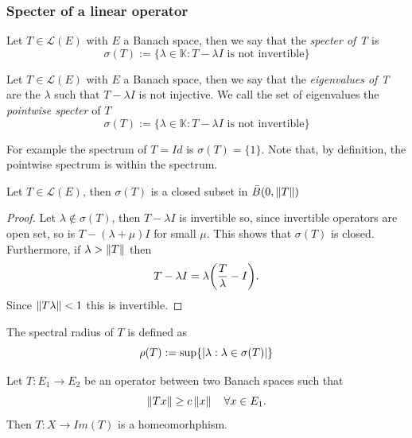 \documentclass[
    a4paper,
    DIV=14,
    abstract=true,
    numbers=noenddot
]{scrartcl}
\begin{document}
\subsubsection{Specter of a linear operator}
\begin{definition}
	Let $T\in\mathcal{L}(E)$ with $E$ a Banach space, then we say that the \emph{specter of T} is
	\begin{equation*}
		\sigma(T):=\{\lambda\in\mathbb{K}: T-\lambda I \text{ is not invertible}\}
	\end{equation*}
\end{definition}
\begin{definition}
	Let $T\in\mathcal{L}(E)$ with $E$ a Banach space, then we say that the \emph{eigenvalues of T} are the $\lambda$ such that $T-\lambda I$ is not injective. We call the set of eigenvalues the \emph{pointwise specter} of $T$
	\begin{equation*}
		\sigma(T):=\{\lambda\in\mathbb{K}: T-\lambda I \text{ is not invertible}\}
	\end{equation*}
\end{definition}
For example the spectrum of $T=Id$ is $\sigma(T)=\{1\}$. Note that, by definition, the pointwise spectrum is within the spectrum.
\begin{proposition}
	Let $T\in\mathcal{L}(E)$, then $\sigma(T)$ is a closed subset in $\bar{B}(0,\left\lVert T \right\rVert)$
\end{proposition}
\begin{proof}
	Let $\lambda\notin \sigma(T)$, then $T-\lambda I$ is invertible so, since invertible operators are open set, so is  $T-(\lambda+\mu) I$ for small $\mu$. This shows that $\sigma(T)$ is closed. Furthermore, if $\lambda>\left\lVert T \right\rVert$ then
	\begin{equation*}
		T-\lambda I=\lambda \qty(\frac{T}{\lambda}-I).
	\end{equation*}
	Since $\left\lVert T\lambda \right\rVert<1$ this is invertible.
\end{proof}
\begin{definition}
	The spectral radius of $T$ is defined as
	\begin{equation*}
		\rho(T):=\sup\{\left| \lambda:\lambda\in\sigma(T) \right|\}
	\end{equation*}
\end{definition}
\begin{proposition}
	Let $T:E_1\to E_2$ be an operator between two Banach spaces such that
	\begin{equation*}
		\left\lVert Tx \right\rVert\geq c\left\lVert x \right\rVert\quad\forall x\in E_1.
	\end{equation*}
	Then $T:X\to Im(T)$ is a homeomorhphism.
\end{proposition}
\end{document}
